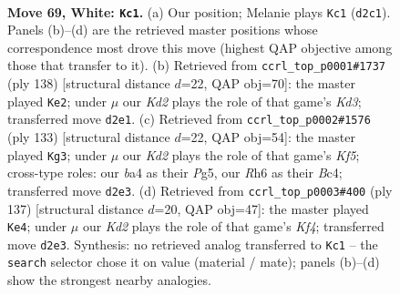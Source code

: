 \documentclass[11pt]{article}
\begin{document}
\clearpage

\begin{figure}[p]\centering
\begin{subfigure}{0.46\textwidth}\centering
\resizebox{\linewidth}{!}{%
\newchessgame
\chessboard[
  setfen={8/4k3/7R/p7/bPp5/P7/1B1K2r1/8 w - - 1 69},
  showmover=false,
  pgfstyle=straightmove, color=movearrow, markmove={d2-c1}
]}
\caption{}
\end{subfigure}\hfill
\begin{subfigure}{0.46\textwidth}\centering
\resizebox{\linewidth}{!}{%
\newchessgame
\chessboard[
  setfen={8/8/7R/2k2p1p/3b1B1P/r2K2P1/8/8 w - - 4 70},
  showmover=false,
  pgfstyle=straightmove, color=movearrow, markmove={d3-e2}
]}
\caption{}
\end{subfigure}
\\[4pt]
\begin{subfigure}{0.46\textwidth}\centering
\resizebox{\linewidth}{!}{%
\newchessgame
\chessboard[
  setfen={5R2/8/1PB4p/6p1/2b2kP1/7P/1r6/6K1 b - - 2 67},
  showmover=false,
  pgfstyle=straightmove, color=movearrow, markmove={f4-g3}
]}
\caption{}
\end{subfigure}\hfill
\begin{subfigure}{0.46\textwidth}\centering
\resizebox{\linewidth}{!}{%
\newchessgame
\chessboard[
  setfen={8/8/8/1p3k1R/pBb5/P5r1/8/2K5 b - - 19 69},
  showmover=false,
  pgfstyle=straightmove, color=movearrow, markmove={f5-e4}
]}
\caption{}
\end{subfigure}
\caption{\textbf{Move 69, White: \texttt{Kc1}.} (a) Our position; Melanie plays \texttt{Kc1} (\texttt{d2c1}). Panels (b)--(d) are the retrieved master positions whose correspondence most drove this move (highest QAP objective among those that transfer to it). (b) Retrieved from \texttt{ccrl\_top\_p0001\#1737} (ply 138) [structural distance $d$=22, QAP obj=70]: the master played \texttt{Ke2}; under $\mu$ our \emph{Kd2} plays the role of that game's \emph{Kd3}; transferred move \texttt{d2e1}. (c) Retrieved from \texttt{ccrl\_top\_p0002\#1576} (ply 133) [structural distance $d$=22, QAP obj=54]: the master played \texttt{Kg3}; under $\mu$ our \emph{Kd2} plays the role of that game's \emph{Kf5}; cross-type roles: our \emph{b}a4 as their \emph{P}g5, our \emph{R}h6 as their \emph{B}c4; transferred move \texttt{d2e3}. (d) Retrieved from \texttt{ccrl\_top\_p0003\#400} (ply 137) [structural distance $d$=20, QAP obj=47]: the master played \texttt{Ke4}; under $\mu$ our \emph{Kd2} plays the role of that game's \emph{Kf4}; transferred move \texttt{d2e3}. Synthesis: no retrieved analog transferred to \texttt{Kc1} -- the \texttt{search} selector chose it on value (material / mate); panels (b)--(d) show the strongest nearby analogies.}
\label{fig:thought-m136}
\end{figure}
\end{document}
